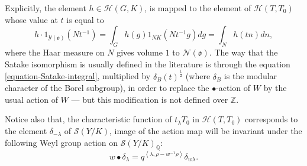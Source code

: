 Explicitly, the element $h \in \mathcal H(G,K)$, is mapped to the element of $\mathcal H(T,T_0)$ whose value at $t$ is equal to 
\begin{equation}
 \label{equation-Satake-integral}
h\cdot 1_{\mathcal Y(\mathfrak o)} (Nt^{-1}) = \int_G h(g) 1_{NK} (Nt^{-1}g) dg =  \int_N h(tn) dn,
\end{equation}
where the Haar measure on $N$ gives volume $1$ to $\mathcal N(\mathfrak o)$. The way that the Satake isomorphism is usually defined in the literature is through the equation \eqref{equation-Satake-integral}, multiplied by $\delta_B(t)^{\frac{1}{2}}$ (where $\delta_B$ is the modular character of the Borel subgroup), in order to replace the $\bullet$-action of $W$ by the usual action of $W$ --- but this modification is not defined over $\mathbb Z$.

Notice also that, the characteristic function of $t_\lambda T_0$ in $\mathcal H(T,T_0)$ corresponds to the element $\delta_{-\lambda}$ of $\mathcal S(Y/K)$, image of the action map will be invariant under the following Weyl group action on $\mathcal S(Y/K)_{\mathbb Q}$:
\begin{equation}
 \label{equation-bullet-Weyl}
w\bullet \delta_{\lambda} = q^{\left < \lambda, \rho - w^{-1}\rho\right>} \delta_{w\lambda}.
\end{equation}

